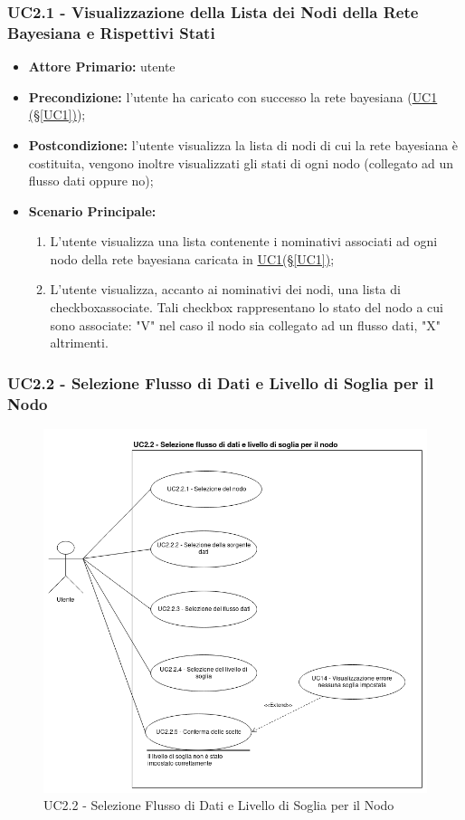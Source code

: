 \subsubsection{UC2.1 - Visualizzazione della Lista dei Nodi della Rete Bayesiana e Rispettivi Stati}\label{UC2.1}
\begin{itemize}
\item \textbf{Attore Primario:}  utente
\item \textbf{Precondizione:} l'utente ha caricato con successo la rete bayesiana (\hyperref[UC1]{UC1 									(§\ref*{UC1})});
\item \textbf{Postcondizione:} l'utente visualizza la lista di nodi di cui la rete bayesiana è costituita, vengono 			inoltre visualizzati gli stati di ogni nodo (collegato ad un flusso dati oppure no);
\item \textbf{Scenario Principale:}
	\begin{enumerate}
	\item L'utente visualizza una lista contenente i nominativi associati ad ogni nodo della rete bayesiana caricata 				in \hyperref[UC1]{UC1(§\ref*{UC1})};
	\item L'utente visualizza, accanto ai nominativi dei nodi, una lista di checkbox\glossario associate. Tali checkbox 							rappresentano lo stato del nodo a cui sono associate: "V" nel caso il nodo sia collegato ad un flusso dati, "X" 		altrimenti.
	\end{enumerate}
\end{itemize}

\pagebreak

\subsubsection{UC2.2 - Selezione Flusso di Dati e Livello di Soglia per il Nodo}\label{UC2.2}

\begin{figure}[H]
\centering
\includegraphics[scale=0.5]{./images/UC2-2.png}
\caption{UC2.2 - Selezione Flusso di Dati e Livello di Soglia per il Nodo}
\end{figure}

